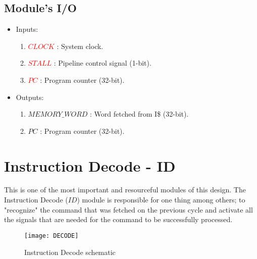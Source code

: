	\subsection{Module's I/O}
	\label{SubSec3.1.1:I/O}
	 {\small
 	 \renewcommand{\labelenumii}{\Roman{enumii}}
	 \begin{itemize}
	 	\item Inputs:
	 	\begin{enumerate}
	 		
	 		\item \textcolor{red}{$CLOCK$} : System clock.
	 		\item \textcolor{red}{$STALL$} : Pipeline control signal (1-bit).
	 		\item \textcolor{red}{$PC$}    : Program counter (32-bit).
	 	\end{enumerate}
 		\item Outputs:
 		\begin{enumerate}
 		
 			\item \textcolor{forestgreen(web)}{$MEMORY\_WORD$} : Word fetched from I\$ (32-bit).
 			\item \textcolor{forestgreen(web)}{$PC$}	 	   : Program counter (32-bit).
 		\end{enumerate}
	 \end{itemize}}
 	\vspace{5mm}
 	 
 	\clearpage
 	
\section{Instruction Decode - ID}
 	\label{Sec3.2:ID}
 	This is one of the most important and resourceful modules of this design. The Instruction Decode ($ID$) module is responsible for one thing among others; to "recognize" the command that was fetched on the previous cycle and activate all the signals that are needed for the command to be successfully processed.
 	
 	\begin{figure}[h!]
 		\begin{center}
 			\texttt{[image: DECODE]}
 			\caption{Instruction Decode schematic}
 			\label{Image3.2}
 		\end{center}
 	\end{figure}
 	
 	\vspace{2mm}
 	
